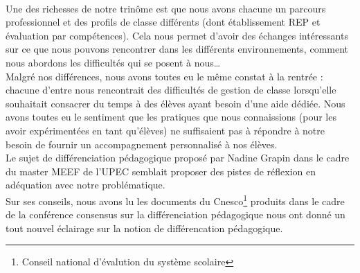 \paragraph{} Une des richesses de notre trinôme est que nous avons chacune un parcours professionnel et des profils de classe différents (dont établissement REP et évaluation par compétences). Cela nous permet d'avoir des échanges intéressants sur ce que nous pouvons rencontrer dans les différents environnements, comment nous abordons les difficultés qui se posent à nous\ldots \\
Malgré nos différences, nous avons toutes eu le même constat à la rentrée : chacune d'entre nous rencontrait des difficultés de gestion de classe lorsqu'elle souhaitait consacrer du temps à des élèves ayant besoin d'une aide dédiée. Nous avons toutes eu le sentiment que les pratiques que nous connaissions (pour les avoir expérimentées en tant qu'élèves) ne suffisaient pas à répondre à notre besoin de fournir un accompagnement personnalisé à nos élèves.\\
Le sujet de différenciation pédagogique proposé par Nadine Grapin dans le cadre du master MEEF de l'UPEC semblait proposer des pistes de réflexion en adéquation avec notre problématique.\\
Sur ses conseils, nous avons lu les documents du Cnesco\footnote{Conseil national d'évalution du système scolaire} produits dans le cadre de la conférence consensus sur la différenciation pédagogique nous ont donné un tout nouvel éclairage sur la notion de différencation pédagogique.
